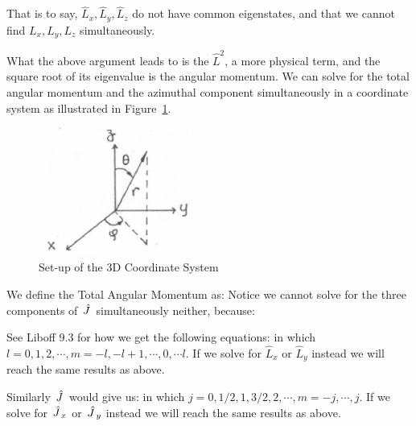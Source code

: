 \documentclass{school-22.101-notes}
\begin{document}
That is to say, $\hat{L}_x, \hat{L}_y, \hat{L}_z$ do not have common eigenstates, and that we cannot find $L_x, L_y, L_z$ simultaneously. 

What the above argument leads to is the $\hat{L}^2$,  a more physical term, and the square root of its eigenvalue is the angular momentum. 
We can solve for the total angular momentum and the azimuthal component simultaneously in a coordinate system as illustrated in Figure~\ref{3DCS}. 
\begin{figure}
    \centering
    \includegraphics[width=2in]{images/qm/3DCS.png}
    \caption{Set-up of the 3D Coordinate System\label{3DCS}}
\end{figure}

We define the Total Angular Momentum as:
\eqn{ \Jhat = \Lhat + \Shat }
Notice we cannot solve for the three components of $\left. \hat{J} \right.$ simultaneously neither, because: 


See Liboff 9.3 for how we get the following equations: 
in which $l = 0,1,2, \cdots, m = -l, -l+1, \cdots, 0, \cdots l$. If we solve for $\hat{L}_x$ or $\hat{L}_y$ instead we will reach the same results as above. 

Similarly $\left. \hat{J} \right.$ would give us:
in which $j = 0,1/2,1,3/2,2, \cdots, m = -j, \cdots, j$. If we solve for $\left. \hat{J} \right._x$ or $\left. \hat{J} \right._y$ instead we will reach the same results as above. 
\end{document}
